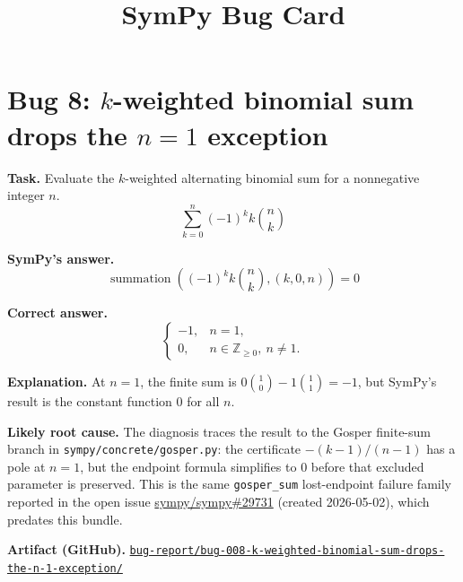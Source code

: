 \documentclass[11pt]{article}
\title{SymPy Bug Card}
\author{}
\date{}
\newcommand{\artifactrepo}{https://github.com/TODO-org/TODO-repo}
\newcommand{\bugbundle}[1]{\href{\artifactrepo/tree/main/bug-report/#1}{\nolinkurl{bug-report/#1/}}}
\begin{document}
\maketitle

\section*{Bug 8: \(k\)-weighted binomial sum drops the \texorpdfstring{\(n=1\)}{n=1} exception}

\begin{counterexamplebox}
\textbf{Task.} Evaluate the \(k\)-weighted alternating binomial sum for a
nonnegative integer \(n\).
\[
\sum_{k=0}^{n} (-1)^k k\binom{n}{k}
\]

\medskip
\textbf{SymPy's answer.}
\[
\operatorname{summation}\!\left((-1)^k k\binom{n}{k},(k,0,n)\right)=0
\]

\medskip
\textbf{Correct answer.}
\[
\begin{cases}
-1, & n=1,\\
0, & n\in\mathbb{Z}_{\ge 0},\ n\ne 1.
\end{cases}
\]

\medskip
\textbf{Explanation.} At \(n=1\), the finite sum is
\(0\binom{1}{0}-1\binom{1}{1}=-1\), but SymPy's result is the constant function \(0\) for all \(n\).  

\medskip
\textbf{Likely root cause.} The diagnosis traces the result to the Gosper
finite-sum branch in \nolinkurl{sympy/concrete/gosper.py}: the certificate
\(-(k-1)/(n-1)\) has a pole at \(n=1\), but the endpoint formula simplifies to
\(0\) before that excluded parameter is preserved.  This is the same
\texttt{gosper\_sum} lost-endpoint failure family reported in the open issue
\href{https://github.com/sympy/sympy/issues/29731}{sympy/sympy\#29731}
(created 2026-05-02), which predates this bundle.

\medskip
\textbf{Artifact (GitHub).} \bugbundle{bug-008-k-weighted-binomial-sum-drops-the-n-1-exception}
\end{counterexamplebox}
\end{document}
